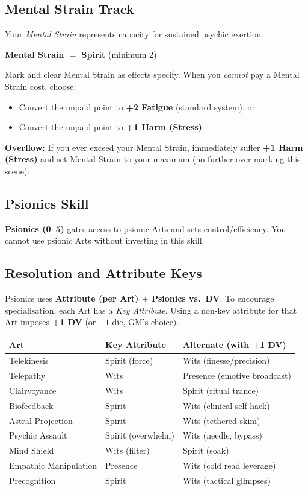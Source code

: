 \documentclass[11pt,twoside]{article}
\begin{document}
\subsection{Mental Strain Track}
Your \emph{Mental Strain} represents capacity for sustained psychic exertion.

\begin{center}
\textbf{Mental Strain $=$ Spirit} \quad (minimum 2)
\end{center}

Mark and clear Mental Strain as effects specify. When you \emph{cannot} pay a Mental Strain cost, choose:
\begin{itemize}[leftmargin=*]
  \item Convert the unpaid point to \textbf{+2 Fatigue} (standard system), or
  \item Convert the unpaid point to \textbf{+1 Harm (Stress)}.
\end{itemize}
\textbf{Overflow:} If you ever exceed your Mental Strain, immediately suffer \textbf{+1 Harm (Stress)} and set Mental Strain to your maximum (no further over-marking this scene).

\subsection{Psionics Skill}
\textbf{Psionics (0--5)} gates access to psionic Arts and sets control/efficiency. You cannot use psionic Arts without investing in this skill.

\subsection{Resolution and Attribute Keys}
Psionics uses \textbf{Attribute (per Art) $+$ Psionics vs.\ DV}. To encourage specialisation, each Art has a \emph{Key Attribute}. Using a non-key attribute for that Art imposes \textbf{+1 DV} (or $-1$ die, GM's choice).

\begin{center}
\renewcommand{\arraystretch}{1.1}
\begin{longtable}[c]{@{}lll@{}}
\toprule
\textbf{Art} & \textbf{Key Attribute} & \textbf{Alternate (with +1 DV)} \\
\midrule
Telekinesis & Spirit (force) & Wits (finesse/precision) \\
Telepathy & Wits & Presence (emotive broadcast) \\
Clairvoyance & Wits & Spirit (ritual trance) \\
Biofeedback & Spirit & Wits (clinical self-hack) \\
Astral Projection & Spirit & Wits (tethered skim) \\
Psychic Assault & Spirit (overwhelm) & Wits (needle, bypass) \\
Mind Shield & Wits (filter) & Spirit (soak) \\
Empathic Manipulation & Presence & Wits (cold read leverage) \\
Precognition & Spirit & Wits (tactical glimpses) \\
\bottomrule
\end{longtable}
\end{center}
\end{document}
